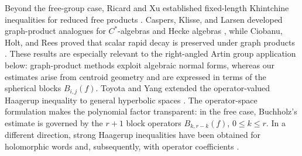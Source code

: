 \documentclass[12pt,reqno]{amsart}
\numberwithin{equation}{section}
\begin{document}
Beyond the free-group case, Ricard and Xu established fixed-length Khintchine inequalities for reduced free products \cite{RicardXu2006reducedfreeproducts}. Caspers, Klisse, and Larsen developed graph-product analogues for $C^*$-algebras and Hecke algebras \cite{CaspersKlisseLarsen2021graphproduct}, while Ciobanu, Holt, and Rees proved that scalar rapid decay is preserved under graph products \cite{CiobanyHoltRees2013rdgraphproducts}. These results are especially relevant to the right-angled Artin group application below: graph-product methods exploit algebraic normal forms, whereas our estimates arise from centroid geometry and are expressed in terms of the spherical blocks $B_{i,j}(f)$. Toyota and Yang extended the operator-valued Haagerup inequality to general hyperbolic spaces \cite{ToyotaYang2026OVhyperbolic}. The operator-space formulation makes the polynomial factor transparent: in the free case, Buchholz's estimate is governed by the $r+1$ block operators $B_{k,r-k}(f)$, $0\le k\le r$. In a different direction, strong Haagerup inequalities have been obtained for holomorphic words and, subsequently, with operator coefficients \cite{KempSpeicher2007strongHaagerupscalar,delaSalle2009strongHaagerup}.
\end{document}
